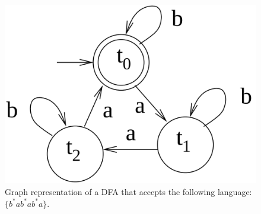 \begin{figure}
\begin{center}
  \includegraphics[scale=0.17]{./images/CA_FDM/amod3Automata}
  \caption[Graph representation of a DFA.]{Graph representation of a DFA that accepts the following language: $\{b^*ab^*ab^*a\}$.}
  \label{amod3Automata}
\end{center}
\end{figure}


